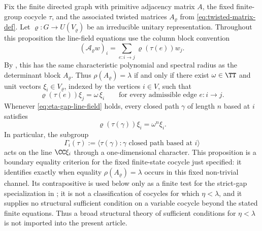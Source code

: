\begin{proposition}
  \label{thm:eta-gap-rigidity}
  Fix the finite directed graph with primitive adjacency matrix \(A\), the
  fixed finite-group cocycle \(\tau\), and the associated twisted matrices
  \(A_\varrho\) from \eqref{eq:twisted-matrix-def}.  Let
  \(\varrho:G\to U(V_\varrho)\) be an irreducible unitary representation.
  Throughout this proposition the line-field equations use the column block
  convention
  \[
    (\mathcal A_\varrho w)_i
    =
    \sum_{e:i\to j}\varrho(\tau(e))w_j .
  \]
  By , this has the same
  characteristic polynomial and spectral radius as the determinant block
  \(A_\varrho\).
  Thus \(\rho(A_\varrho)=\lambda\) if and only if there exist
  \(\omega\in\TT\) and unit vectors
  \(\xi_i\in V_\varrho\), indexed by the vertices \(i\in V\), such that
  \begin{equation}\label{eq:eta-gap-line-field}
    \varrho(\tau(e))\xi_j=\omega\,\xi_i
    \qquad
    \text{for every admissible edge } e:i\to j.
  \end{equation}
  Whenever \eqref{eq:eta-gap-line-field} holds, every closed path
  \(\gamma\) of length \(n\) based at \(i\) satisfies
  \begin{equation}\label{eq:eta-gap-loop-character}
    \varrho(\tau(\gamma))\xi_i=\omega^n\xi_i.
  \end{equation}
  In particular, the subgroup
  \[
    \Gamma_i(\tau)
    :=
    \bigl\langle \tau(\gamma):
      \gamma \text{ closed path based at } i
    \bigr\rangle
  \]
  acts on the line \(\CC\xi_i\) through a one-dimensional character.  This
  proposition is a boundary equality criterion for the fixed finite-state cocycle
  just specified: it identifies exactly when equality
  \(\rho(A_\varrho)=\lambda\) occurs in this fixed non-trivial channel.  Its
  contrapositive is used below only as a finite test for the strict-gap
  specialization in ; it is not a classification of cocycles
  for which \(\eta<\lambda\), and it supplies no structural sufficient
  condition on a variable cocycle beyond the stated finite equations.  Thus a
  broad structural theory of sufficient conditions for \(\eta<\lambda\) is not
  imported into the present article.
\end{proposition}

